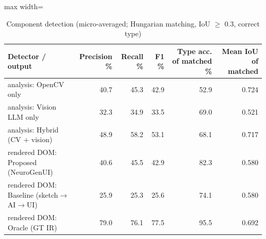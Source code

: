 \begin{table}[t]
\centering
\scriptsize
\caption{Component detection (micro-averaged; Hungarian matching, IoU $\geq$ 0.3, correct type)}
\label{tab:detection}
\setlength{\tabcolsep}{3.5pt}
\begin{adjustbox}{max width=\textwidth}
\begin{tabular}{lrrrrr}
\toprule
\textbf{Detector / output} & \textbf{Precision \%} & \textbf{Recall \%} & \textbf{F1 \%} & \textbf{Type acc. of matched \%} & \textbf{Mean IoU of matched} \\
\midrule
analysis: OpenCV only & 40.7 & 45.3 & 42.9 & 52.9 & 0.724 \\
analysis: Vision LLM only & 32.3 & 34.9 & 33.5 & 69.0 & 0.521 \\
analysis: Hybrid (CV + vision) & 48.9 & 58.2 & 53.1 & 68.1 & 0.717 \\
rendered DOM: Proposed (NeuroGenUI) & 40.6 & 45.5 & 42.9 & 82.3 & 0.580 \\
rendered DOM: Baseline (sketch$\rightarrow$AI$\rightarrow$UI) & 25.9 & 25.3 & 25.6 & 74.1 & 0.580 \\
rendered DOM: Oracle (GT IR) & 79.0 & 76.1 & 77.5 & 95.5 & 0.692 \\
\bottomrule
\end{tabular}
\end{adjustbox}
\end{table}
